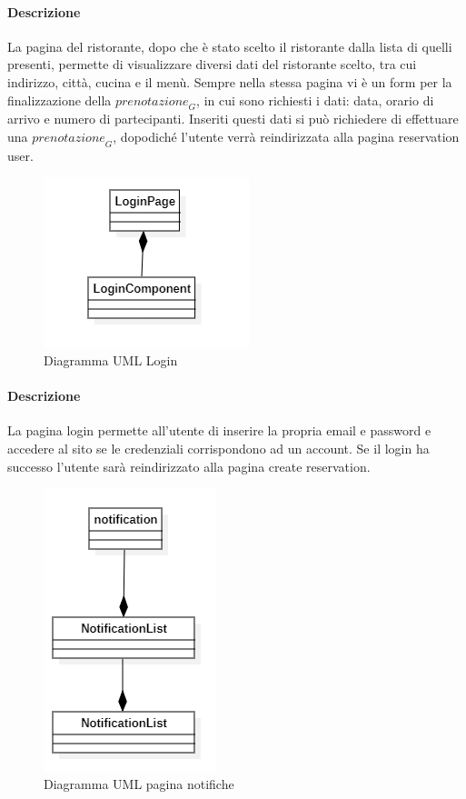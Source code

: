 \paragraph{Descrizione} La pagina del ristorante, dopo che è stato scelto il ristorante dalla lista di quelli presenti, permette di visualizzare diversi dati del ristorante scelto, tra cui indirizzo, città, cucina e il menù.
Sempre nella stessa pagina vi è un form per la finalizzazione della $\textit{prenotazione}_G$, in cui sono richiesti i dati: data, orario di arrivo e numero di partecipanti. Inseriti questi dati si può richiedere di effettuare una $\textit{prenotazione}_G$, dopodiché l'utente verrà reindirizzata alla pagina reservation user.


\begin{figure}[H]
    \centering
    \includegraphics[width=0.3\linewidth]{images/login.png}
    \caption{Diagramma UML Login}
    \label{fig:UML-login}
\end{figure}
\paragraph{Descrizione} La pagina login permette all'utente di inserire la propria email e password e accedere al sito se le credenziali corrispondono ad un account. Se il login ha successo l'utente sarà reindirizzato alla pagina create reservation. 

\begin{figure}[H]
    \centering
    \includegraphics[width=0.3\linewidth]{images/notification_page.png}
    \caption{Diagramma UML pagina notifiche}
    \label{fig:UML-notification_page}
\end{figure}

